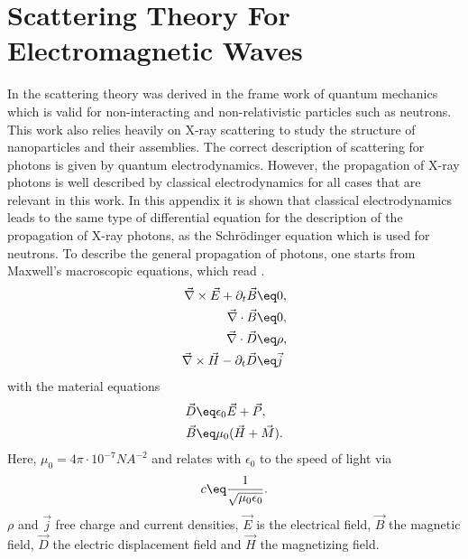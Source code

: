 \documentclass[\main/dresen_thesis.tex]{subfiles}
\begin{document}
  \section{Scattering Theory For Electromagnetic Waves}
    \label{ch:appendix:calculations:scatteringTheoryElectromagneticWaves}
    In  the scattering theory was derived in the frame work of quantum mechanics which is valid for non-interacting and non-relativistic particles such as neutrons.
    This work also relies heavily on X-ray scattering to study the structure of nanoparticles and their assemblies.
    The correct description of scattering for photons is given by quantum electrodynamics.
    However, the propagation of X-ray photons is well described by classical electrodynamics for all cases that are relevant in this work.
    In this appendix it is shown that classical electrodynamics leads to the same type of differential equation for the description of the propagation of X-ray photons, as the Schr\"odinger equation which is used for neutrons.
    To describe the general propagation of photons, one starts from Maxwell's macroscopic equations, which read \cite{Jackson_1999_Class}.
    \begin{align}
      \vec{\nabla} \times \vec{E} + \partial_t \vec{B} \eq& 0,\\
      \vec{\nabla} \cdot \vec{B} \eq& 0,\\
      \vec{\nabla} \cdot \vec{D}  \eq& \rho,\\
      \vec{\nabla} \times \vec{H} - \partial_t \vec{D} \eq& \vec{j}
    \end{align}
    with the material equations
    \begin{align}
      \vec{D} \eq& \epsilon_0 \vec{E} + \vec{P},\\
      \vec{B} \eq& \mu_0 (\vec{H} + \vec{M}).
    \end{align}
    Here, $\mu_0 = 4 \pi \cdot 10^{-7} \unit{N A^{-2}}$ and relates with $\epsilon_0$ to the speed of light via
    \begin{equation}
      c \eq \frac{1}{\sqrt{\mu_0 \epsilon_0}}.
    \end{equation}
    $\rho$ and $\vec{j}$ free charge and current densities, $\vec{E}$ is the electrical field, $\vec{B}$ the magnetic field, $\vec{D}$ the electric displacement field and $\vec{H}$ the magnetizing field. 
\end{document}
